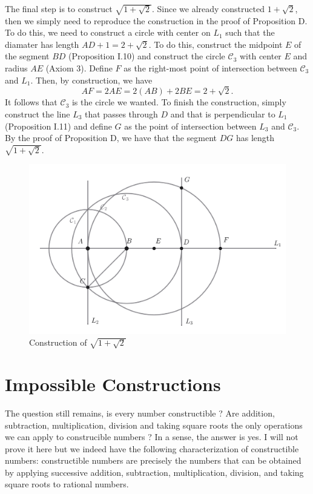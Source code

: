\documentclass{article}
\theoremstyle{plain}
\theoremstyle{definition}
\begin{document}
The final step is to construct $\sqrt{1 + \sqrt{2}}$. Since we already constructed $1 + \sqrt{2}$, then we simply need to reproduce the construction in the proof of Proposition D. To do this, we need to construct a circle with center on $L_1$ such that the diamater has length $AD + 1 = 2 + \sqrt{2}$. To do this, construct the midpoint $E$ of the segment $BD$ (Proposition I.10) and construct the circle $\mathcal{C}_3$ with center $E$ and radius $AE$ (Axiom 3). Define $F$ as the right-most point of intersection between $\mathcal{C}_3$ and $L_1$. Then, by construction, we have
$$AF = 2AE = 2(AB) + 2BE = 2 + \sqrt{2}.$$
It follows that $\mathcal{C}_3$ is the circle we wanted. To finish the construction, simply construct the line $L_3$ that passes through $D$ and that is perpendicular to $L_1$ (Proposition I.11) and define $G$ as the point of intersection between $L_3$ and $\mathcal{C}_3$. By the proof of Proposition D, we have that the segment $DG$ has length $\sqrt{1 + \sqrt{2}}$.

\begin{figure}[h!]
    \centering
    \includegraphics[scale=0.5]{pics/sqrt(2 + sqrt(2)).png}
    \caption{Construction of $\sqrt{1 + \sqrt{2}}$}
\end{figure}

\section*{Impossible Constructions}

The question still remains, is every number constructible ? Are addition, subtraction, multiplication, division and taking square roots the only operations we can apply to construcible numbers ? In a sense, the answer is yes. I will not prove it here but we indeed have the following characterization of constructible numbers: constructible numbers are precisely the numbers that can be obtained by applying successive addition, subtraction, multiplication, division, and taking square roots to rational numbers. 
\end{document}
